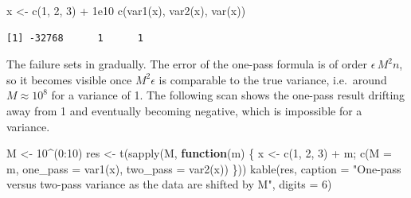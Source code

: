 \documentclass[
  letterpaper,
  DIV=11,
  numbers=noendperiod]{scrreprt}
\newenvironment{Shaded}{\begin{snugshade}}{\end{snugshade}}
\newcommand{\AttributeTok}[1]{\textcolor[rgb]{0.40,0.45,0.13}{#1}}
\newcommand{\ControlFlowTok}[1]{\textcolor[rgb]{0.00,0.23,0.31}{\textbf{#1}}}
\newcommand{\DecValTok}[1]{\textcolor[rgb]{0.68,0.00,0.00}{#1}}
\newcommand{\FloatTok}[1]{\textcolor[rgb]{0.68,0.00,0.00}{#1}}
\newcommand{\FunctionTok}[1]{\textcolor[rgb]{0.28,0.35,0.67}{#1}}
\newcommand{\NormalTok}[1]{\textcolor[rgb]{0.00,0.23,0.31}{#1}}
\newcommand{\OtherTok}[1]{\textcolor[rgb]{0.00,0.23,0.31}{#1}}
\newcommand{\SpecialCharTok}[1]{\textcolor[rgb]{0.37,0.37,0.37}{#1}}
\newcommand{\StringTok}[1]{\textcolor[rgb]{0.13,0.47,0.30}{#1}}
\begin{document}
\begin{Shaded}
\begin{Highlighting}[]
\NormalTok{x }\OtherTok{\textless{}{-}} \FunctionTok{c}\NormalTok{(}\DecValTok{1}\NormalTok{, }\DecValTok{2}\NormalTok{, }\DecValTok{3}\NormalTok{) }\SpecialCharTok{+} \FloatTok{1e10}
\FunctionTok{c}\NormalTok{(}\FunctionTok{var1}\NormalTok{(x), }\FunctionTok{var2}\NormalTok{(x), }\FunctionTok{var}\NormalTok{(x))}
\end{Highlighting}
\end{Shaded}

\begin{verbatim}
[1] -32768      1      1
\end{verbatim}

The failure sets in gradually. The error of the one-pass formula is of
order \(\epsilon\,M^2 n\), so it becomes visible once \(M^2\epsilon\) is
comparable to the true variance, i.e.~around \(M\approx 10^{8}\) for a
variance of 1. The following scan shows the one-pass result drifting
away from 1 and eventually becoming negative, which is impossible for a
variance.

\begin{Shaded}
\begin{Highlighting}[]
\NormalTok{M }\OtherTok{\textless{}{-}} \DecValTok{10}\SpecialCharTok{\^{}}\NormalTok{(}\DecValTok{0}\SpecialCharTok{:}\DecValTok{10}\NormalTok{)}
\NormalTok{res }\OtherTok{\textless{}{-}} \FunctionTok{t}\NormalTok{(}\FunctionTok{sapply}\NormalTok{(M, }\ControlFlowTok{function}\NormalTok{(m) \{ x }\OtherTok{\textless{}{-}} \FunctionTok{c}\NormalTok{(}\DecValTok{1}\NormalTok{, }\DecValTok{2}\NormalTok{, }\DecValTok{3}\NormalTok{) }\SpecialCharTok{+}\NormalTok{ m; }\FunctionTok{c}\NormalTok{(}\AttributeTok{M =}\NormalTok{ m, }\AttributeTok{one\_pass =} \FunctionTok{var1}\NormalTok{(x), }\AttributeTok{two\_pass =} \FunctionTok{var2}\NormalTok{(x)) \}))}
\FunctionTok{kable}\NormalTok{(res, }\AttributeTok{caption =} \StringTok{"One{-}pass versus two{-}pass variance as the data are shifted by M"}\NormalTok{, }\AttributeTok{digits =} \DecValTok{6}\NormalTok{)}
\end{Highlighting}
\end{Shaded}
\end{document}
